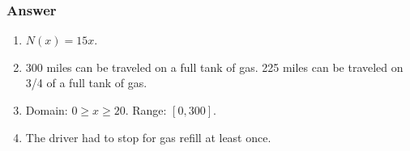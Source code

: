 \subsubsection*{Answer}

\begin{enumerate}[label = (\alph*)]
  \item
    $ N(x) = 15x $.
  \item
    300 miles can be traveled on a full tank of gas. 225 miles can be traveled on 3/4 of a full tank of gas.
  \item
    Domain: $ 0 \ge x \ge 20 $. Range: $ [0, 300] $.
  \item
    The driver had to stop for gas refill at least once.

\end{enumerate}
